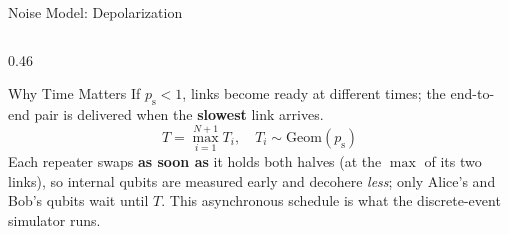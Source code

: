 \documentclass[aspectratio=169, 11pt]{beamer}
\newcommand{\pw}{p_{\mathrm{w}}}
\newcommand{\ps}{p_{\mathrm{s}}}
\begin{document}
\begin{frame}{Noise Model: Depolarization}
  \begin{columns}[c]
    \begin{column}{0.46\textwidth}
      \begin{block}{Why Time Matters}
        {\small If $\ps < 1$, links become ready at different times; the
        end-to-end pair is delivered when the \textbf{slowest} link arrives.}
        \vspace{-0.3em}
        \[
          T = \max_{i=1}^{N+1} T_i, \quad T_i \sim \mathrm{Geom}(\ps)
        \]
        \vspace{-0.3em}
        {\footnotesize Each repeater swaps \textbf{as soon as} it holds both
        halves (at the $\max$ of its two links), so internal qubits are measured
        early and decohere \emph{less}; only Alice's and Bob's qubits wait until
        $T$. This asynchronous schedule is what the discrete-event simulator runs.}
      \end{block}
    \end{column}
  \end{columns}
\end{frame}
\end{document}
